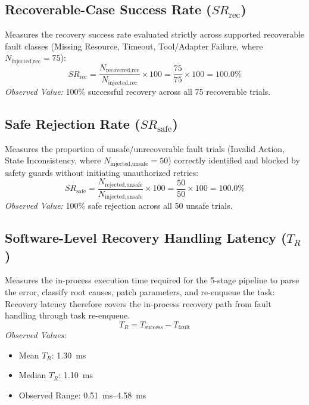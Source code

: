\documentclass[conference]{IEEEtran}
\begin{document}
\subsection{Recoverable-Case Success Rate ($SR_{\text{rec}}$)}
Measures the recovery success rate evaluated strictly across supported recoverable fault classes (Missing Resource, Timeout, Tool/Adapter Failure, where $N_{\text{injected,rec}} = 75$):
\begin{equation}
SR_{\text{rec}} = \frac{N_{\text{recovered,rec}}}{N_{\text{injected,rec}}} \times 100 = \frac{75}{75} \times 100 = 100.0\%
\end{equation}
\textit{Observed Value:} 100\% successful recovery across all 75 recoverable trials.

\subsection{Safe Rejection Rate ($SR_{\text{safe}}$)}
Measures the proportion of unsafe/unrecoverable fault trials (Invalid Action, State Inconsistency, where $N_{\text{injected,unsafe}} = 50$) correctly identified and blocked by safety guards without initiating unauthorized retries:
\begin{equation}
SR_{\text{safe}} = \frac{N_{\text{rejected,unsafe}}}{N_{\text{injected,unsafe}}} \times 100 = \frac{50}{50} \times 100 = 100.0\%
\end{equation}
\textit{Observed Value:} 100\% safe rejection across all 50 unsafe trials.

\subsection{Software-Level Recovery Handling Latency ($T_R$)}
Measures the in-process execution time required for the 5-stage pipeline to parse the error, classify root causes, patch parameters, and re-enqueue the task: Recovery latency therefore covers the in-process recovery path from fault handling through task re-enqueue.
\begin{equation}
T_R = T_{\text{success}} - T_{\text{fault}}
\end{equation}
\textit{Observed Values:}
\begin{itemize}
    \item Mean $T_R$: 1.30~ms
    \item Median $T_R$: 1.10~ms
    \item Observed Range: 0.51~ms--4.58~ms
\end{itemize}
\end{document}
